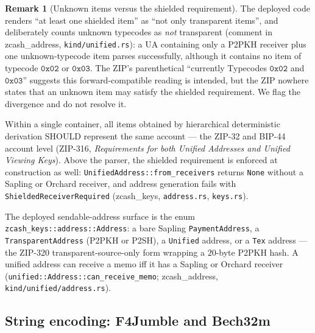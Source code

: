 \documentclass[11pt,a4paper]{article}
\theoremstyle{definition}
\newtheorem{remark}[theorem]{Remark}
\begin{document}
\begin{remark}[Unknown items versus the shielded requirement]\label{rem:unknown-shielded}
The deployed code renders ``at least one shielded item'' as ``not only
transparent items'', and deliberately counts unknown typecodes as
\emph{not} transparent (comment in \textsf{zcash\_address},
\texttt{kind/unified.rs}): a UA containing only a P2PKH receiver plus one
unknown-typecode item parses successfully, although it contains no item of
typecode $\mathtt{0x02}$ or $\mathtt{0x03}$. The ZIP's parenthetical
``currently Typecodes $\mathtt{0x02}$ and $\mathtt{0x03}$'' suggests this
forward-compatible reading is intended, but the ZIP nowhere states that an
unknown item may satisfy the shielded requirement. We flag the divergence
and do not resolve it.
\end{remark}

Within a single container, all items obtained by hierarchical
deterministic derivation SHOULD represent the same account --- the ZIP-32
and BIP-44 account level (ZIP-316, \emph{Requirements for both Unified
Addresses and Unified Viewing Keys}). Above the parser, the shielded
requirement is enforced at construction as well:
\texttt{UnifiedAddress::from\_receivers} returns \texttt{None} without a
Sapling or Orchard receiver, and address generation fails with
\texttt{ShieldedReceiverRequired} (\textsf{zcash\_keys},
\texttt{address.rs}, \texttt{keys.rs}).

The deployed sendable-address surface is the enum
\texttt{zcash\_keys::address::Address}: a bare Sapling
\texttt{PaymentAddress}, a \texttt{TransparentAddress} (P2PKH or P2SH), a
\texttt{Unified} address, or a \texttt{Tex} address --- the ZIP-320
transparent-source-only form wrapping a $20$-byte P2PKH hash. A unified
address can receive a memo iff it has a Sapling or Orchard receiver
(\texttt{unified::Address::can\_receive\_memo}; \textsf{zcash\_address},
\texttt{kind/unified/address.rs}).

\subsection{String encoding: F4Jumble and Bech32m}\label{sec:addresses-jumble}
\end{document}
